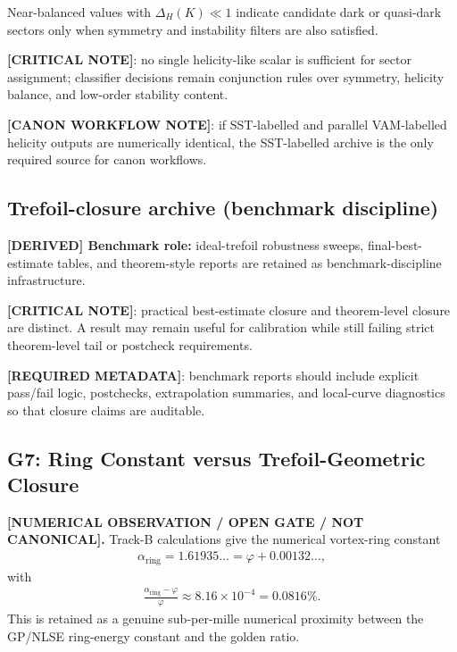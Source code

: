 Near-balanced values with $\Delta_H(K)\ll 1$ indicate candidate dark or quasi-dark sectors only when symmetry and instability filters are also satisfied.

\textbf{[CRITICAL NOTE]}: no single helicity-like scalar is sufficient for sector assignment; classifier decisions remain conjunction rules over symmetry, helicity balance, and low-order stability content.

\textbf{[CANON WORKFLOW NOTE]}: if SST-labelled and parallel VAM-labelled helicity outputs are numerically identical, the SST-labelled archive is the only required source for canon workflows.

\subsection{Trefoil-closure archive (benchmark discipline)}
\textbf{[DERIVED] Benchmark role:} ideal-trefoil robustness sweeps, final-best-estimate tables, and theorem-style reports are retained as benchmark-discipline infrastructure.

\textbf{[CRITICAL NOTE]}: practical best-estimate closure and theorem-level closure are distinct.
A result may remain useful for calibration while still failing strict theorem-level tail or postcheck requirements.

\textbf{[REQUIRED METADATA]}: benchmark reports should include explicit pass/fail logic, postchecks, extrapolation summaries, and local-curve diagnostics so that closure claims are auditable.

\subsection{G7: Ring Constant versus Trefoil-Geometric Closure}
\label{subsec:g7_ring_constant_vs_trefoil_closure}

\textbf{[NUMERICAL OBSERVATION / OPEN GATE / NOT CANONICAL].}
Track-B calculations give the numerical vortex-ring constant
\begin{align}
    \alpha_{\mathrm{ring}}
    =
    1.61935\ldots
    =
    \varphi + 0.00132\ldots ,
\end{align}
with
\begin{align}
    \frac{\alpha_{\mathrm{ring}}-\varphi}{\varphi}
    \approx
    8.16\times 10^{-4}
    =
    0.0816\%.
\end{align}
This is retained as a genuine sub-per-mille numerical proximity between the
GP/NLSE ring-energy constant and the golden ratio.

